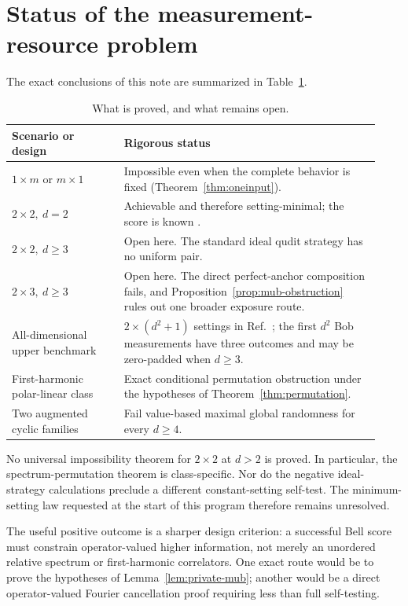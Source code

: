 \documentclass[11pt]{article}
\theoremstyle{remark}
\begin{document}
\section{Status of the measurement-resource problem}

The exact conclusions of this note are summarized in
Table~\ref{tab:status}.

\begin{table}[h]
\centering
\small
\begin{tabular}{@{}
>{\raggedright\arraybackslash}p{0.29\linewidth}
>{\raggedright\arraybackslash}p{0.64\linewidth}@{}}
\toprule
Scenario or design & Rigorous status\\
\midrule
\(1\times m\) or \(m\times1\)
& Impossible even when the complete behavior is fixed
  (Theorem~\ref{thm:oneinput}).\\
\(2\times2,\ d=2\)
& Achievable and therefore setting-minimal; the score is known
  \cite{WooltortonEtAl2022}.\\
\(2\times2,\ d\geq3\)
& Open here.  The standard ideal qudit strategy has no uniform pair.\\
\(2\times3,\ d\geq3\)
& Open here.  The direct perfect-anchor composition fails, and
  Proposition~\ref{prop:mub-obstruction} rules out one broader exposure
  route.\\
All-dimensional upper benchmark
& \(2\times(d^2+1)\) settings in
  Ref.~\cite{FarkasMironowiczAugusiak2026}; the first \(d^2\) Bob
  measurements have three outcomes and may be zero-padded when \(d\geq3\).\\
First-harmonic polar-linear class
& Exact conditional permutation obstruction under the hypotheses of
  Theorem~\ref{thm:permutation}.\\
Two augmented cyclic families
& Fail value-based maximal global randomness for every \(d\geq4\).\\
\bottomrule
\end{tabular}
\caption{What is proved, and what remains open.}
\label{tab:status}
\end{table}

No universal impossibility theorem for \(2\times2\) at \(d>2\) is proved.
In particular, the spectrum-permutation theorem is class-specific.  Nor do
the negative ideal-strategy calculations preclude a different
constant-setting self-test.  The minimum-setting law requested at the start
of this program therefore remains unresolved.

The useful positive outcome is a sharper design criterion: a successful
Bell score must constrain operator-valued higher information, not merely an
unordered relative spectrum or first-harmonic correlators.  One exact route
would be to prove the hypotheses of Lemma~\ref{lem:private-mub}; another
would be a direct operator-valued Fourier cancellation proof requiring less
than full self-testing.
\end{document}
